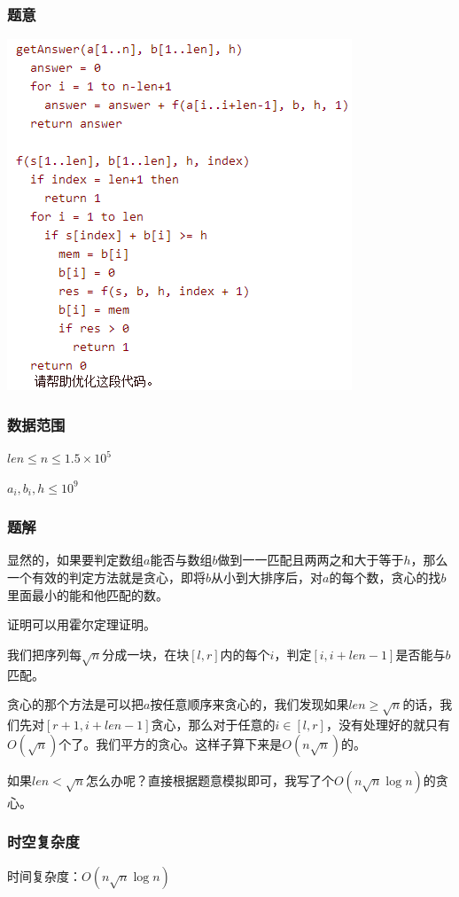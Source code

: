 \documentclass{ctexart}
\begin{document}
\subsubsection{题意}
\includegraphics{Optimize!.png}
\subsubsection{数据范围}
$len \le n \le 1.5 \times 10^5$

$a_i,b_i,h \le 10^9$
\subsubsection{题解}
显然的，如果要判定数组$a$能否与数组$b$做到一一匹配且两两之和大于等于$h$，那么一个有效的判定方法就是贪心，即将$b$从小到大排序后，对$a$的每个数，贪心的找$b$里面最小的能和他匹配的数。

证明可以用霍尔定理证明。

我们把序列每$\sqrt{n}$分成一块，在块$[l,r]$内的每个$i$，判定$[i,i+len-1]$是否能与$b$匹配。

贪心的那个方法是可以把$a$按任意顺序来贪心的，我们发现如果$len \ge \sqrt{n}$的话，我们先对$[r+1,i+len-1]$贪心，那么对于任意的$i \in [l,r]$，没有处理好的就只有$O(\sqrt{n})$个了。我们平方的贪心。这样子算下来是$O(n\sqrt{n})$的。

如果$len < \sqrt{n}$怎么办呢？直接根据题意模拟即可，我写了个$O(n\sqrt{n}\log n)$的贪心。
\subsubsection{时空复杂度}
时间复杂度：$O(n\sqrt{n}\log n)$
\end{document}

